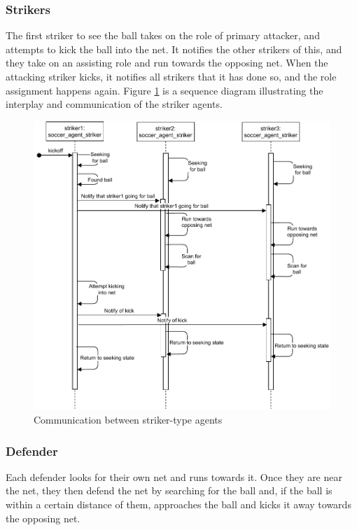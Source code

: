 \documentclass[conference]{IEEEtran}
\begin{document}
	\subsubsection{Strikers}
	The first striker to see the ball takes on the role of primary attacker, and attempts to kick the ball into the net. It notifies the other strikers of this, and they take on an assisting role and run towards the opposing net. When the attacking striker kicks, it notifies all strikers that it has done so, and the role assignment happens again. Figure \ref{sequence-diagram} is a sequence diagram illustrating the interplay and communication of the striker agents.
	\begin{figure}[ht]
		\centering
		\includegraphics[scale=0.5]{fig/sequence-diagram.pdf}
		\caption{Communication between striker-type agents}
		\label{sequence-diagram}
	\end{figure}
	
	\subsubsection{Defender}
	Each defender looks for their own net and runs towards it. Once they are near the net, they then defend the net by searching for the ball and, if the ball is within a certain distance of them, approaches the ball and kicks it away towards the opposing net.
	
\end{document}
